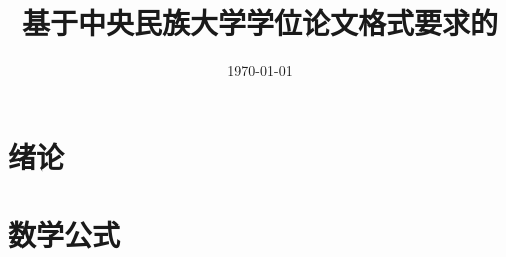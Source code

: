 \documentclass[UTF8,a4paper,12bp]{ctexbook}
\title{基于中央民族大学学位论文格式要求的\LaTeX模板}
\author{\kaishu{民大某学生}}
\date{\today}
\newcommand{\enabstractname}{Abstract}
\newcommand{\cnabstractname}{摘~要}
\newenvironment{enabstract}{%
  \par\small
  \noindent\mbox{}\hfill{\bfseries \zihao{3} \enabstractname}\hfill\mbox{}\par
  \vskip 32bp}{\par\vskip 2.5ex}
\newenvironment{cnabstract}{%
  \par\small
  \noindent\mbox{}\hfill{\heiti \zihao{3} \cnabstractname}\hfill\mbox{}\par
  \vskip 32bp}{\par\vskip 2.5ex}
\begin{document}
    \begin{titlepage}
        
    \end{titlepage}


    \pagestyle{plain}


    
    
    


    \tableofcontents

    \renewcommand{\listfigurename}{插图目录}
    \listoffigures

    \renewcommand{\listtablename}{表格目录}
    \listoftables


    \chapter{绪论}
    \setcounter{page}{1}
    


    \chapter{数学公式}
    
\end{document}
